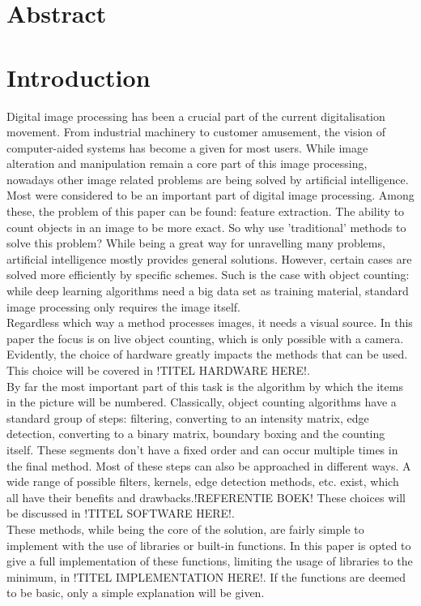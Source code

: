 \documentclass[11pt]{article}
\begin{document}


\section*{Abstract}
\thispagestyle{empty}

\newpage
\tableofcontents
\thispagestyle{empty}

\newpage
\listoftables
\thispagestyle{empty}

\newpage
\listoffigures
\thispagestyle{empty}

\newpage
\section{Introduction}
Digital image processing has been a crucial part of the current digitalisation movement. From industrial machinery to customer amusement, the vision of computer-aided systems has become a given for most users. While image alteration and manipulation remain a core part of this image processing, nowadays other image related problems are being solved by artificial intelligence. Most were considered to be an important part of digital image processing. Among these, the problem of this paper can be found: feature extraction. The ability to count objects in an image to be more exact. So why use 'traditional' methods to solve this problem? While being a great way for unravelling many problems, artificial intelligence mostly provides general solutions. However, certain cases are solved more efficiently by specific schemes. Such is the case with object counting: while deep learning algorithms need a big data set as training material, standard image processing only requires the image itself.\\
Regardless which way a method processes images, it needs a visual source. In this paper the focus is on live object counting, which is only possible with a camera. Evidently, the choice of hardware greatly impacts the methods that can be used. This choice will be covered in !TITEL HARDWARE HERE!.\\
By far the most important part of this task is the algorithm by which the items in the picture will be numbered. Classically, object counting algorithms have a standard group of steps: filtering, converting to an intensity matrix, edge detection, converting to a binary matrix, boundary boxing and the counting itself. These segments don't have a fixed order and can occur multiple times in the final method. Most of these steps can also be approached in different ways. A wide range of possible filters, kernels, edge detection methods, etc. exist, which all have their benefits and drawbacks.!REFERENTIE BOEK! These choices will be discussed in !TITEL SOFTWARE HERE!.\\
These methods, while being the core of the solution, are fairly simple to implement with the use of libraries or built-in functions. In this paper is opted to give a full implementation of these functions, limiting the usage of libraries to the minimum, in !TITEL IMPLEMENTATION HERE!. If the functions are deemed to be basic, only a simple explanation will be given.
\end{document}

